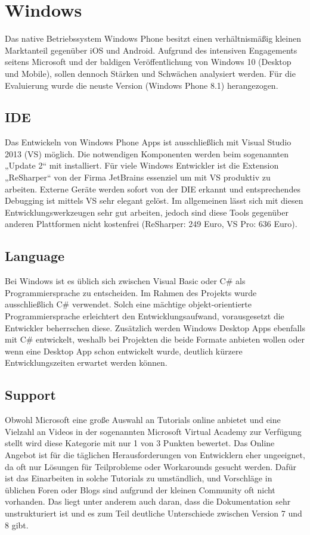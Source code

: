 \section{Windows}

Das native Betriebssystem Windows Phone besitzt einen verhältnismäßig kleinen Marktanteil gegenüber iOS und Android. Aufgrund des intensiven Engagements seitens Microsoft und der baldigen Veröffentlichung von Windows 10 (Desktop und Mobile), sollen dennoch Stärken und Schwächen analysiert werden. Für die Evaluierung wurde die neuste Version (Windows Phone 8.1) herangezogen.

\subsection{IDE}

Das Entwickeln von Windows Phone Apps ist ausschließlich mit Visual Studio 2013 (VS) möglich. Die notwendigen Komponenten werden beim sogenannten „Update 2“ mit installiert. Für viele Windows Entwickler ist die Extension „ReSharper“ von der Firma JetBrains essenziel um mit VS produktiv zu arbeiten. Externe Geräte werden sofort von der DIE erkannt und entsprechendes Debugging ist mittels VS sehr elegant gelöst. Im allgemeinen lässt sich mit diesen Entwicklungswerkzeugen sehr gut arbeiten, jedoch sind diese Tools gegenüber anderen Plattformen nicht kostenfrei (ReSharper: 249 Euro, VS Pro: 636 Euro).

\subsection{Language}

Bei Windows ist es üblich sich zwischen Visual Basic oder C\# als Programmiersprache zu entscheiden. Im Rahmen des Projekts wurde ausschließlich C\# verwendet. Solch eine mächtige objekt-orientierte Programmiersprache erleichtert den Entwicklungsaufwand, vorausgesetzt die Entwickler beherrschen diese. Zusätzlich werden Windows Desktop Apps ebenfalls mit C\# entwickelt, weshalb bei Projekten die beide Formate anbieten wollen oder wenn eine Desktop App schon entwickelt wurde, deutlich kürzere Entwicklungszeiten erwartet werden können.

\subsection{Support}

Obwohl Microsoft eine große Auswahl an Tutorials online anbietet und eine Vielzahl an Videos in der sogenannten Microsoft Virtual Academy zur Verfügung stellt wird diese Kategorie mit nur 1 von 3 Punkten bewertet.  Das Online Angebot ist für die täglichen Herausforderungen von Entwicklern eher ungeeignet, da oft nur Lösungen für Teilprobleme oder Workarounds gesucht werden. Dafür ist das Einarbeiten in solche Tutorials zu umständlich, und Vorschläge in üblichen Foren oder Blogs sind aufgrund der kleinen Community oft nicht vorhanden. Das liegt unter anderem auch daran, dass die Dokumentation sehr unstrukturiert ist und es zum Teil deutliche Unterschiede zwischen Version 7 und 8 gibt.


